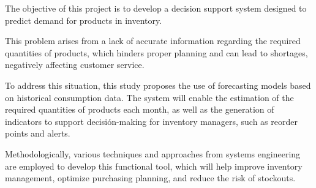 The objective of this project is to develop a decision support system designed to predict demand for products in inventory.

This problem arises from a lack of accurate information regarding the required quantities of products, which hinders proper planning and can lead to shortages, negatively affecting customer service.

To address this situation, this study proposes the use of forecasting models based on historical consumption data. The system will enable the estimation of the required quantities of products each month, as well as the generation of indicators to support decisión-making for inventory managers, such as reorder points and alerts.

Methodologically, various techniques and approaches from systems engineering are employed to develop this functional tool, which will help improve inventory management, optimize purchasing planning, and reduce the risk of stockouts.